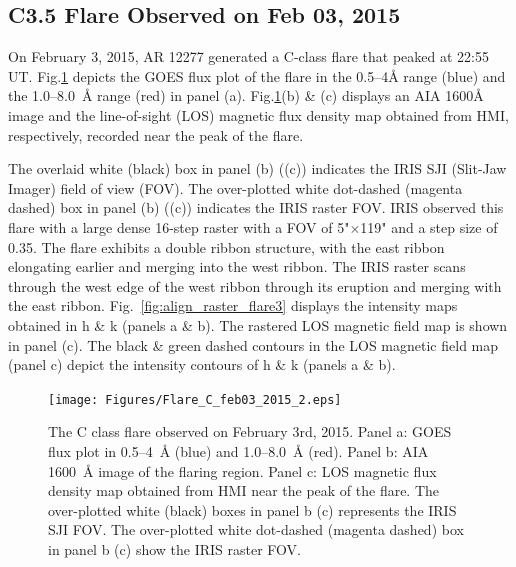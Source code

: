 \subsection{C3.5 Flare Observed on Feb 03, 2015}

On February 3, 2015, AR 12277 generated a C-class flare that peaked at 22:55 UT. Fig.\ref{flare3} depicts the GOES flux plot of the flare in the 0.5{--}4{\AA} range (blue) and the 1.0{--}8.0~{\AA} range (red) in panel (a). Fig.\ref{flare3}(b) \& (c) displays an AIA 1600{\AA} image and the line-of-sight (LOS) magnetic flux density map obtained from HMI, respectively, recorded near the peak of the flare.

The overlaid white (black) box in panel (b) ((c)) indicates the IRIS SJI (Slit-Jaw Imager) field of view (FOV). The over-plotted white dot-dashed (magenta dashed) box in panel (b) ((c)) indicates the IRIS raster FOV. IRIS observed this flare with a large dense 16-step raster with a FOV of 5"$\times$119" and a step size of 0.35\arcsec. The flare exhibits a double ribbon structure, with the east ribbon elongating earlier and merging into the west ribbon. The IRIS raster scans through the west edge of the west ribbon through its eruption and merging with the east ribbon. Fig.~\ref{fig:align_raster_flare3} displays the intensity maps obtained in   h \& k (panels a \& b). The rastered LOS magnetic field map is shown in panel (c). The black \& green dashed contours in the LOS magnetic field map (panel c) depict the intensity contours of   h \& k (panels a \& b).

\begin{figure}[ht!]
    \centering
\hspace*{-.6in}
\texttt{[image: Figures/Flare\_C\_feb03\_2015\_2.eps]}
\caption{The C class flare observed on February 3rd, 2015. Panel a: GOES flux plot in 0.5{--}4~{\AA} (blue) and 1.0{--}8.0~{\AA} (red). Panel b: AIA 1600~{\AA} image of the flaring region. Panel c: LOS magnetic flux density map obtained from HMI near the peak of the flare. The over-plotted white (black) boxes in panel b (c) represents the IRIS SJI FOV. The over-plotted white dot-dashed (magenta dashed) box in panel b (c) show the IRIS raster FOV.}\label{flare3}
\end{figure}

